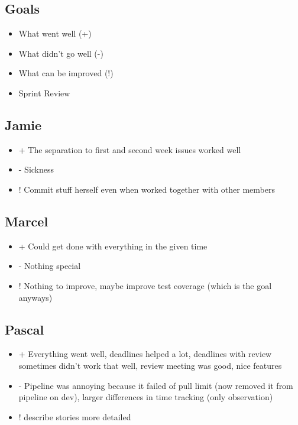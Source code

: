 \subsection{Goals}
\begin{itemize}
    \item What went well (+)
    \item What didn't go well (-)
    \item What can be improved (!)
    \item Sprint Review
\end{itemize}

\subsection{Jamie}
\begin{itemize}
    \item + The separation to first and second week issues worked well
    \item - Sickness
    \item ! Commit stuff herself even when worked together with other members
\end{itemize}

\subsection{Marcel}
\begin{itemize}
    \item + Could get done with everything in the given time
    \item - Nothing special
    \item ! Nothing to improve, maybe improve test coverage (which is the goal anyways)
\end{itemize}

\subsection{Pascal}
\begin{itemize}
    \item + Everything went well, deadlines helped a lot, deadlines with review sometimes didn't work that well, review meeting was good, nice features
    \item - Pipeline was annoying because it failed of pull limit (now removed it from pipeline on dev), larger differences in time tracking (only observation)
    \item ! describe stories more detailed
\end{itemize}

